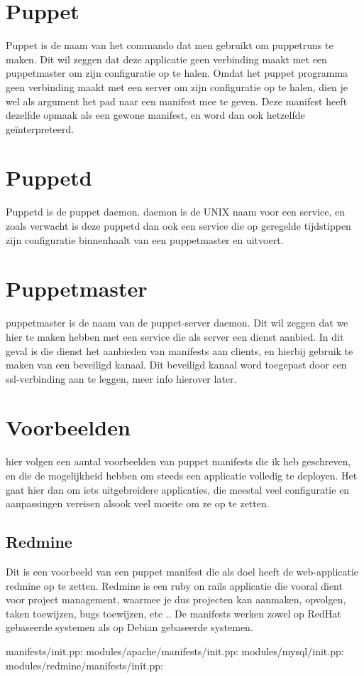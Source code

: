 \section{Puppet}
Puppet is de naam van het commando dat men gebruikt om puppetruns te maken. Dit wil zeggen dat deze applicatie geen verbinding maakt met een puppetmaster om zijn configuratie op te halen. Omdat het puppet programma geen verbinding maakt met een server om zijn configuratie op te halen, dien je wel als argument het pad naar een manifest mee te geven. Deze manifest heeft dezelfde opmaak als een gewone manifest, en word dan ook hetzelfde geïnterpreteerd.

\section{Puppetd}
Puppetd is de puppet daemon. daemon is de UNIX naam voor een service, en zoals verwacht is deze puppetd dan ook een service die op geregelde tijdstippen zijn configuratie binnenhaalt van een puppetmaster en uitvoert.

\section{Puppetmaster}
puppetmaster is de naam van de puppet-server daemon. Dit wil zeggen dat we hier te maken hebben met een service die als server een dienst aanbied. In dit geval is die dienst het aanbieden van manifests aan clients, en hierbij gebruik te maken van een beveiligd kanaal.
Dit beveiligd kanaal word toegepast door een ssl-verbinding aan te leggen, meer info hierover later.

\section{Voorbeelden}
hier volgen een aantal voorbeelden van puppet manifests die ik heb geschreven, en die de mogelijkheid hebben om steeds een applicatie volledig te deployen.
Het gaat hier dan om iets uitgebreidere applicaties, die meestal veel configuratie en aanpassingen vereisen alsook veel moeite om ze op te zetten.

\subsection{Redmine}
Dit is een voorbeeld van een puppet manifest die als doel heeft de web-applicatie redmine op te zetten. Redmine is een ruby on rails applicatie die vooral dient voor project management, waarmee je dus projecten kan aanmaken, opvolgen, taken toewijzen, bugs toewijzen, etc ..
De manifests werken zowel op RedHat gebaseerde systemen als op Debian gebaseerde systemen.

manifests/init.pp:
modules/apache/manifests/init.pp:
modules/mysql/init.pp:
modules/redmine/manifests/init.pp:
